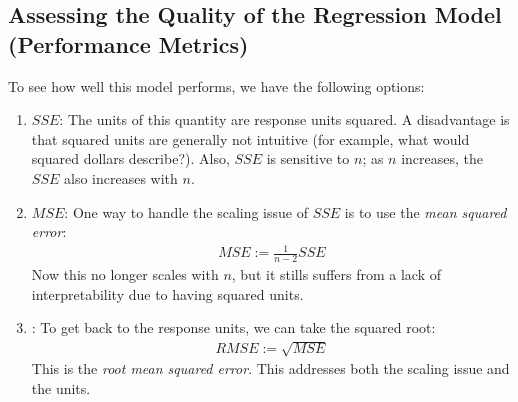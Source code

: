 \documentclass[12pt, a4paper]{article}
\theoremstyle{definition}
\begin{document}
	\subsection*{Assessing the Quality of the Regression Model (Performance Metrics)}
	To see how well this model performs, we have the following options:
	\begin{enumerate}[label=(\arabic*)]
		\item \textbf{$SSE$}: The units of this quantity are response units squared.
		A disadvantage is that squared units are generally not intuitive (for example,
		what would squared dollars describe?). Also, $SSE$ is sensitive to $n$; as $n$
		increases, the $SSE$ also increases with $n$.
		\item \textbf{$MSE$}: One way to handle the scaling issue of $SSE$ is to use
		the \emph{mean squared error}:
		\begin{align*}
			MSE := \frac{1}{n-2}SSE
		\end{align*}
		Now this no longer scales with $n$, but it stills suffers from a lack of interpretability
		due to having squared units.
		\item {}: To get back to the response units, we can take the squared root:
		\begin{align*}
			RMSE :=\sqrt{MSE}
		\end{align*}
		This is the \emph{root mean squared error}. This addresses both the scaling issue
		and the units.
	\end{enumerate}
\end{document}
